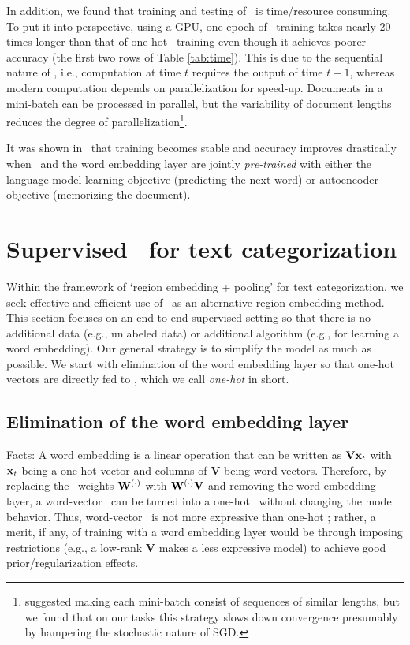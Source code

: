 \documentclass{article}
\begin{document}
In addition, we found that training and testing of \wvLstm\ is time/resource consuming. 
To put it into perspective, using a GPU, one epoch of \wvLstm\ training 
takes nearly 20 times longer than that of one-hot \cnn\ training even though it achieves poorer accuracy 
(the first two rows of Table \ref{tab:time}). 
This is due to the sequential nature of \lstm, i.e., computation at time $t$ requires the output of time $t-1$, 
whereas modern computation depends on parallelization for speed-up.  
Documents in a mini-batch can be processed in parallel, but the variability of document lengths 
reduces the degree of parallelization\footnote{
  \cite{SVL14} suggested making each mini-batch consist of sequences of similar lengths, but we found that on our tasks 
  this strategy slows down convergence presumably by hampering the stochastic nature of SGD. 
}. 


It was shown in \DLa\ that training becomes stable and accuracy improves drastically 
when \lstm\ and the word embedding layer are jointly {\em pre-trained} with either the language model learning 
objective (predicting the next word) or autoencoder objective (memorizing the document).  

\section{Supervised \lstm\ for text categorization}
\label{sec:sup}

Within the framework of `region embedding + pooling' for text categorization, 
we seek effective and efficient use of \lstm\ as an alternative region embedding method. 
This section focuses on an end-to-end supervised setting so that 
there is no additional data (e.g., unlabeled data) or additional algorithm (e.g., for learning a word embedding). 
Our general strategy is to simplify the model as much as possible. 
We start with 
elimination of the word embedding layer  
so that one-hot vectors are directly fed to \lstm, 
which we call {\em one-hot \lstm} in short.  


\subsection{Elimination of the word embedding layer} 
\label{sec:onehot}
\newcommand{\wordW}{{\mathbf V}}
Facts: A word embedding is a linear operation that can be written as $\wordW\xx_t$ 
with ${\mathbf x}_t$ being a one-hot vector and columns of $\wordW$ being word vectors.  
Therefore, 
by replacing the \lstm\ weights ${\mathbf W}^{(\cdot)}$ with $\anyWx\wordW$ and removing the word embedding layer, 
a word-vector \lstm\ can be turned into a one-hot \lstm\ without changing the model behavior.  
Thus, word-vector \lstm\ is not more expressive than one-hot \lstm; rather, 
a merit, if any, of 
training with a word embedding layer would be through imposing restrictions
(e.g., a low-rank $\wordW$ makes a less expressive model) 
to achieve good prior/regularization effects. 
\end{document}
